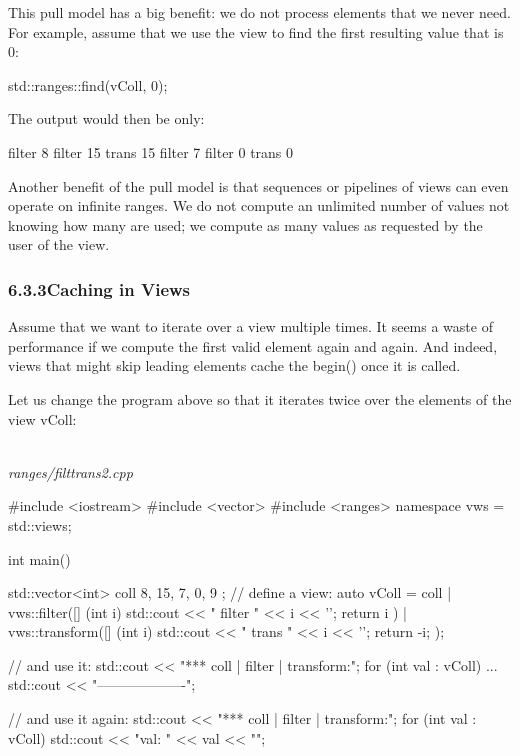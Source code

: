 This pull model has a big benefit: we do not process elements that we never need. For example, assume that we use the view to find the first resulting value that is 0:

\begin{cpp}
std::ranges::find(vColl, 0);
\end{cpp}

The output would then be only:

{\footnotesize
\begin{shell}
filter 8
filter 15
trans 15
filter 7
filter 0
trans 0
\end{shell}
}

Another benefit of the pull model is that sequences or pipelines of views can even operate on infinite ranges. We do not compute an unlimited number of values not knowing how many are used; we compute as many values as requested by the user of the view.

\subsubsection*{ 6.3.3\hspace{0.2cm}Caching in Views}

Assume that we want to iterate over a view multiple times. It seems a waste of performance if we compute the first valid element again and again. And indeed, views that might skip leading elements cache the begin() once it is called.

Let us change the program above so that it iterates twice over the elements of the view vColl:

\noindent
\hspace*{\fill} \\ %
\textit{ranges/filttrans2.cpp}

\begin{cpp}
#include <iostream>
#include <vector>
#include <ranges>
namespace vws = std::views;

int main()
{
	std::vector<int> coll{ 8, 15, 7, 0, 9 };
	// define a view:
	auto vColl = coll
	| vws::filter([] (int i) {
		std::cout << " filter " << i << '\n';
		return i %
	})
	| vws::transform([] (int i) {
		std::cout << " trans " << i << '\n';
		return -i;
	});
	
	// and use it:
	std::cout << "*** coll | filter | transform:\n";
	for (int val : vColl) {
		...
	}
	std::cout << "-------------------\n";
	
	// and use it again:
	std::cout << "*** coll | filter | transform:\n";
	for (int val : vColl) {
		std::cout << "val: " << val << "\n\n";
	}
}
\end{cpp}

